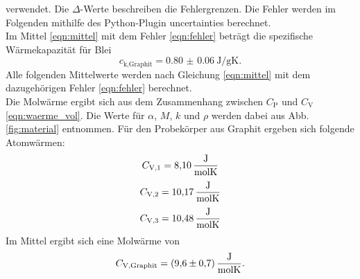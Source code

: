 verwendet. Die $\Delta$-Werte beschreiben die Fehlergrenzen.
Die Fehler werden im Folgenden mithilfe des Python-Plugin uncertainties \cite{uncertainties} berechnet.
\\
Im Mittel \eqref{eqn:mittel} mit dem Fehler \eqref{eqn:fehler} beträgt die spezifische Wärmekapazität für Blei
\begin{equation}
    c_\text{k,Graphit} = \SI{0.80(6)}{\joule/\gram\kelvin} .
\end{equation}
Alle folgenden Mittelwerte werden nach Gleichung \eqref{eqn:mittel} mit dem dazugehörigen Fehler \eqref{eqn:fehler} berechnet.
\\
Die Molwärme ergibt sich aus dem Zusammenhang zwischen $C_\text{P}$ und $C_\text{V}$ \eqref{eqn:waerme_vol}.
Die Werte für $\alpha$, $M$, $k$ und $\rho$ werden dabei aus Abb. \ref{fig:material} entnommen.
Für den Probekörper aus Graphit ergeben sich folgende Atomwärmen:
\begin{equation*}
    C_\text{V,1} = \SI{8.10}{\frac{\joule}{\mol\kelvin}}
\end{equation*}
\begin{equation*}
    C_\text{V,2} = \SI{10.17}{\frac{\joule}{\mol\kelvin}}
\end{equation*}
\begin{equation*}
    C_\text{V,3} = \SI{10.48}{\frac{\joule}{\mol\kelvin}}
\end{equation*}
Im Mittel ergibt sich eine Molwärme von
\begin{equation}
    C_\text{V,Graphit} = \SI{9.6(7)}{\frac{\joule}{\mol\kelvin}} .
\end{equation}

